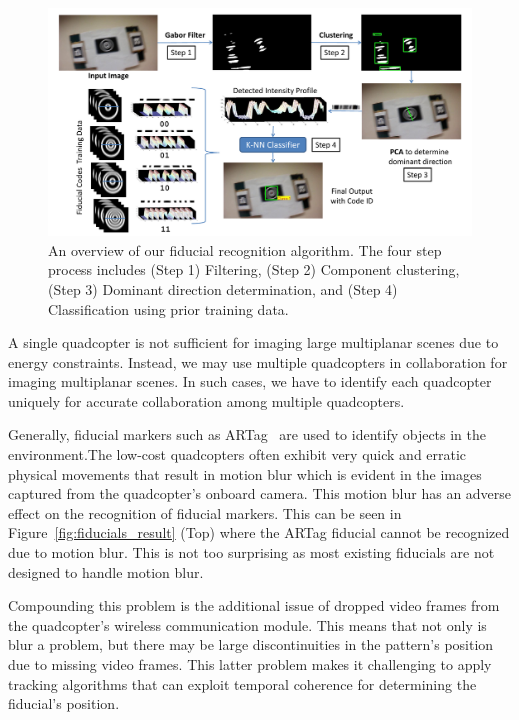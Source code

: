 \begin{figure}[h!]
\centering
\includegraphics[width=0.98\linewidth]{figures/fiducial/overall_flow}
\caption[Overall Workflow of blur resilient fiducial recognition algorithm]{An
overview of our fiducial recognition algorithm.
    The four step process includes (Step 1) Filtering,
    (Step 2) Component clustering, (Step 3) Dominant direction determination,
    and (Step 4) Classification using prior training data.}
 \label{fig:fiducial_workflow}
\end{figure}

A single quadcopter is not sufficient for imaging large multiplanar scenes due
to energy constraints. Instead, we may use multiple quadcopters in
collaboration for imaging multiplanar scenes. In such cases, we have to identify
each quadcopter uniquely for accurate collaboration among multiple quadcopters. 

Generally, fiducial markers such as ARTag~\cite{Fiala05} are used to identify
objects in the environment.The low-cost quadcopters often exhibit very quick and 
erratic physical movements that result in motion blur which is evident in the images 
captured from the quadcopter's onboard camera. This motion blur has an adverse effect
on the recognition of fiducial markers. This can be seen in Figure~\ref{fig:fiducials_result} (Top) where the
ARTag fiducial cannot be recognized due to motion blur. This is not too
surprising as most existing fiducials are not designed to handle motion blur.

Compounding this problem is the additional issue of dropped video
frames from the quadcopter's wireless communication module. This means
that not only is blur a problem, but there may be large
discontinuities in the pattern's position due to missing video
frames. This latter problem makes it challenging to apply tracking algorithms
that can exploit temporal coherence for determining the fiducial's position.

